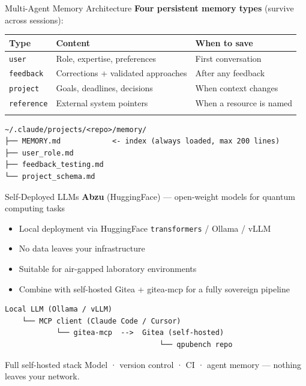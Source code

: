 \documentclass[
  ignorenonframetext,
  aspectratio=169,
]{beamer}
\providecommand{\tightlist}{%
  \setlength{\itemsep}{0pt}\setlength{\parskip}{0pt}}
\begin{document}
\begin{frame}[fragile]{Multi-Agent Memory Architecture}
\label{multi-agent-memory-architecture}
\textbf{Four persistent memory types} (survive across sessions):

\begin{longtable}[]{@{}lll@{}}
\toprule\noalign{}
Type & Content & When to save \\
\midrule\noalign{}
\endhead
\texttt{user} & Role, expertise, preferences & First conversation \\
\texttt{feedback} & Corrections + validated approaches & After any
feedback \\
\texttt{project} & Goals, deadlines, decisions & When context changes \\
\texttt{reference} & External system pointers & When a resource is
named \\
\bottomrule\noalign{}
\end{longtable}

\begin{verbatim}
~/.claude/projects/<repo>/memory/
├── MEMORY.md            <- index (always loaded, max 200 lines)
├── user_role.md
├── feedback_testing.md
└── project_schema.md
\end{verbatim}
\end{frame}

\begin{frame}[fragile]{Self-Deployed LLMs}
\label{self-deployed-llms}
\textbf{Abzu} (HuggingFace) --- open-weight models for quantum computing
tasks

\begin{itemize}
\tightlist
\item
  Local deployment via HuggingFace \texttt{transformers} / Ollama / vLLM
\item
  No data leaves your infrastructure
\item
  Suitable for air-gapped laboratory environments
\item
  Combine with self-hosted Gitea + gitea-mcp for a fully sovereign
  pipeline
\end{itemize}

\vspace{0.3em}

\begin{verbatim}
Local LLM (Ollama / vLLM)
    └── MCP client (Claude Code / Cursor)
            └── gitea-mcp  -->  Gitea (self-hosted)
                                    └── qpubench repo
\end{verbatim}

\begin{block}{Full self-hosted stack}
Model · version control · CI · agent memory — nothing leaves your network.
\end{block}
\end{frame}
\end{document}
